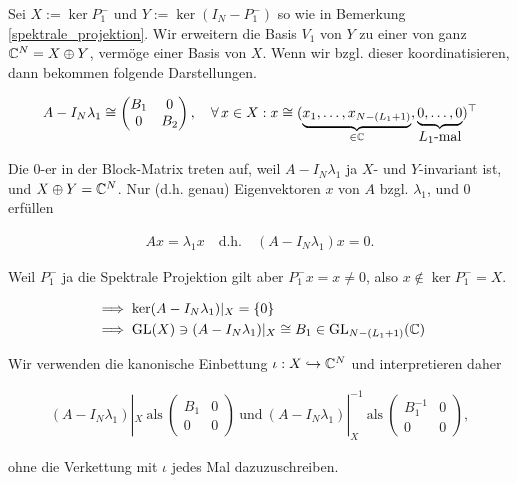 \begin{remark} \label{semi_inverse}

    Sei $X := \ker P_1^-$ und $Y := \ker (I_N - P_1^-)$ so wie in Bemerkung \ref{spektrale_projektion}.
    Wir erweitern die Basis $V_1$ von $Y$ zu einer von ganz $\mathbb{C}^N = X \oplus Y$, vermöge einer Basis von $X$.
    Wenn wir bzgl. dieser koordinatisieren, dann bekommen folgende Darstellungen.

    \begin{align*}
        A - I_N \lambda_1
        \cong
        \begin{pmatrix}
            B_1 & 0 \\
            0   & B_2
        \end{pmatrix},
        \quad
        \forall \, x \in X:
            x
            \cong
            (
                \underbrace
                {
                    x_1, \dots, x_{N - (L_1 + 1)}
                }_{
                    \in \mathbb{C}
                },
                \underbrace
                {
                    0, \dots, 0
                }_{
                    \displaystyle
                    \text{$L_1$-mal}
                }
            )^\top
    \end{align*}

    Die $0$-er in der Block-Matrix treten auf, weil $A - I_N \lambda_1$ ja $X$- und $Y$-invariant ist, und $X \oplus Y = \mathbb{C}^N$.
    Nur (d.h. genau) Eigenvektoren $x$ von $A$ bzgl. $\lambda_1$, und $0$ erfüllen

    \begin{align*}
        A x = \lambda_1 x
        \quad
        \text{d.h.}
        \quad
        (A - I_N \lambda_1) x = 0.
    \end{align*}

    Weil $P_1^-$ ja die Spektrale Projektion gilt aber $P_1^- x = x \neq 0$, also $x \not \in \ker P_1^- = X$.

    \begin{align*}
        & \implies
        \ker (A - I_N \lambda_1) |_X = {\left \{ 0 \right \}} \\
        & \implies
        \operatorname{GL}(X) \ni (A - I_N \lambda_1) |_X \cong B_1 \in \operatorname{GL}_{N - (L_1 + 1)}(\mathbb{C})
    \end{align*}

    Wir verwenden die kanonische Einbettung $\iota: X \hookrightarrow \mathbb{C}^N$ und interpretieren daher

    \begin{align*}
        (A - I_N \lambda_1) |_X
        ~\text{als}~
        \begin{pmatrix}
            B_1 & 0 \\ 0 & 0
        \end{pmatrix}
        ~\text{und}~
        (A - I_N \lambda_1) |_X^{-1}
        ~\text{als}~
        \begin{pmatrix}
            B_1^{-1} & 0 \\ 0 & 0
        \end{pmatrix},
    \end{align*}

    ohne die Verkettung mit $\iota$ jedes Mal dazuzuschreiben.

\end{remark}